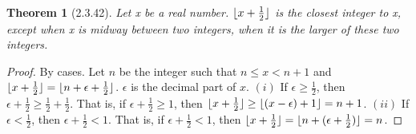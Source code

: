 \documentclass[a4paper, 12pt]{article}
\theoremstyle{plain}
\newtheorem*{theorem*}{Theorem}
\DeclarePairedDelimiter{\floor}{\lfloor}{\rfloor}
\begin{document}
	
	\begin{theorem*}[2.3.42]
		Let x be a real number. $\floor{x + \frac{1}{2}}$ is the closest integer to x, except when 
		x is midway between two integers, when it is the larger of these two integers.
	\end{theorem*}
	
	\begin{proof}
		By cases. Let $n$ be the integer such that $n \le x < n+1$ and \newline 
		$\floor{x + \frac{1}{2}} = \floor{n + \epsilon + \frac{1}{2}}$. $\epsilon$ is the decimal 
		part of $x$. \newline \newline $(i)$ If $\epsilon \ge \frac{1}{2}$, then 
		$\epsilon + \frac{1}{2} \ge \frac{1}{2} + \frac{1}{2}$. That is, if 
		$\epsilon + \frac{1}{2} \ge 1$, then \newline  
		$\floor{x + \frac{1}{2}} \ge \floor {(x - \epsilon) + 1} = n + 1$.
		\newline \newline $(ii)$ If $\epsilon < \frac{1}{2}$, then $\epsilon + \frac{1}{2} < 1$. 
		That is, if $\epsilon + \frac{1}{2} < 1$, then \newline 
		$\floor{x + \frac{1}{2}} = \floor{n + (\epsilon + \frac{1}{2})} = n$.
	\end{proof}
\end{document}
